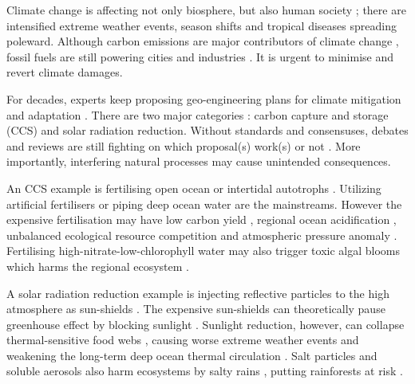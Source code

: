 \documentclass[../thesis.tex]{subfiles} %
\begin{document}
Climate change is affecting not only biosphere, but also human society \autocite{notz2016observed,schuur2015climate}; there are intensified extreme weather events, season shifts and tropical diseases spreading poleward.  Although carbon emissions are major contributors of climate change \autocite{notz2016observed}, fossil fuels are still powering cities and industries \autocite{ferguson2000electricity}.  It is urgent to minimise and revert climate damages.

For decades, experts keep proposing geo-engineering plans for climate mitigation and adaptation \autocite{farrelly2013carbon,yang2008progress,boyd2008ranking,boettcher2019high,vaughan2011review}.  There are two major categories \autocite{boyd2008ranking}: carbon capture and storage (CCS) and solar radiation reduction.  Without standards and consensuses, debates and reviews are still fighting on which proposal(s) work(s) or not \autocite{boyd2008ranking,boettcher2019high,boyd2016development,oschlies2017indicators,gattuso2018ocean}.  More importantly, interfering natural processes may cause unintended consequences.

An CCS example is fertilising open ocean \autocite{gnanadesikan2008export,lovelock2007ocean,lawrence2014efficiency} or intertidal autotrophs \autocite{duarte2017can,johannessen2016geoengineering,krause2016substantial}.  Utilizing artificial fertilisers \autocite{gnanadesikan2008export,lawrence2014efficiency,trick2010iron} or piping deep ocean water \autocite{kwiatkowski2015atmospheric,lovelock2007ocean} are the mainstreams.  However the expensive fertilisation may have low carbon yield \autocite{boyd2008implications,gnanadesikan2008export,oschlies2010side}, regional ocean acidification \autocite{oschlies2010side}, unbalanced ecological resource competition \autocite{chung2011using,thiele2012microbial,batten2014did} and atmospheric pressure anomaly \autocite{kwiatkowski2015atmospheric}.  Fertilising high-nitrate-low-chlorophyll water may also trigger toxic algal blooms which harms the regional ecosystem \autocite{trick2010iron}.

A solar radiation reduction example is injecting reflective particles to the high atmosphere as sun-shields \autocite{latham2008global,stjern2018response,xia2016stratospheric}.  The expensive sun-shields \autocite{boyd2008implications} can theoretically pause greenhouse effect by blocking sunlight \autocite{williamson2012impacts}.  Sunlight reduction, however, can collapse thermal-sensitive food webs \autocite{williamson2012impacts}, causing worse extreme weather events \autocite{jones2009climate} and weakening the long-term deep ocean thermal circulation \autocite{lauvset2017climate,williamson2012impacts}.  Salt particles and soluble aerosols also harm ecosystems by salty rains \autocite{bala2011albedo}, putting rainforests at risk \autocite{muri2015tropical}.
\end{document}
